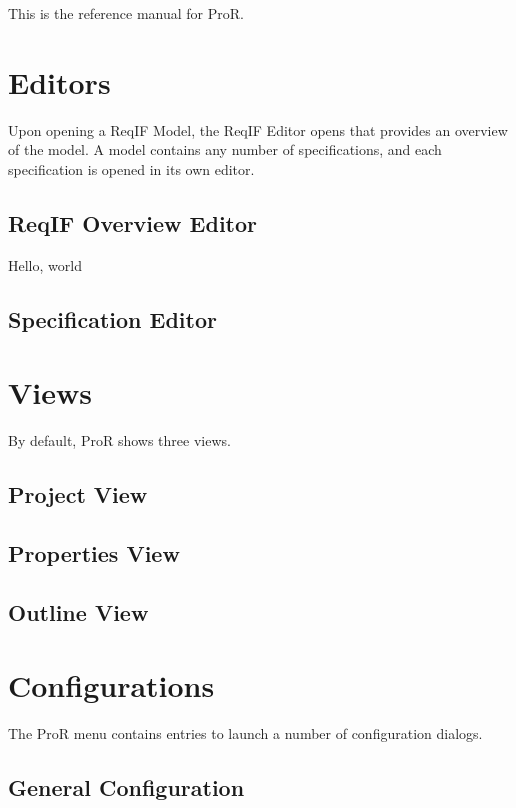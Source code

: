 This is the reference manual for ProR.

\section{Editors}

Upon opening a ReqIF Model, the ReqIF Editor opens that provides an
overview of the model. A model contains any number of specifications,
and each specification is opened in its own editor.

\subsection{ReqIF Overview Editor}

Hello, world

\subsection{Specification Editor}

\section{Views}

By default, ProR shows three views.

\subsection{Project View}

\subsection{Properties View}

\subsection{Outline View}

\section{Configurations}

The ProR menu contains entries to launch a number of configuration
dialogs.

\subsection{General Configuration}

